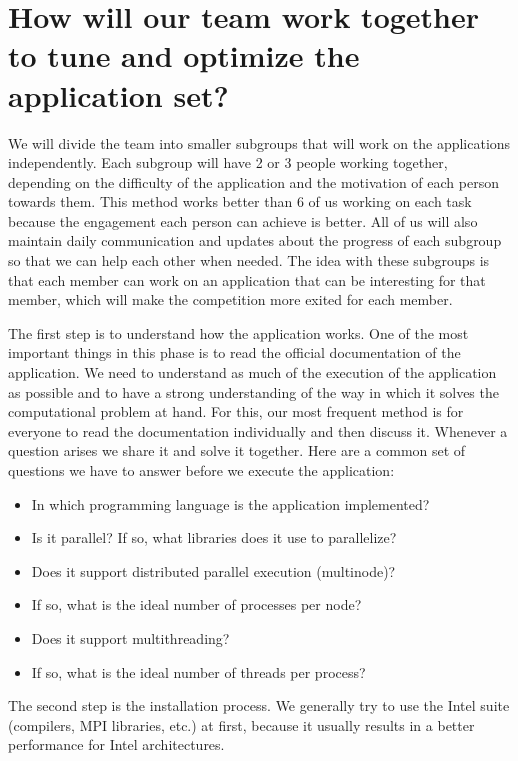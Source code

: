 \documentclass[11pt,a4paper,twocolumn]{article}
\begin{document}
    \section{How will our team work together to tune and optimize the application set?}

    We will divide the team into smaller subgroups that will work on the applications independently. Each subgroup will have 2 or 3 people working together, depending on the difficulty of the application and the motivation of each person towards them. This method works better than 6 of us working on each task because the engagement each person can achieve is better. All of us will also maintain daily communication and updates about the progress of each subgroup so that we can help each other when needed. The idea with these subgroups is that each member can work on an application that can be interesting for that member, which will make the competition more exited for each member.

    The first step is to understand how the application works. One of the most important things in this phase is to read the official documentation of the application. We need to understand as much of the execution of the application as possible and to have a strong understanding of the way in which it solves the computational problem at hand. For this, our most frequent method is for everyone to read the documentation individually and then discuss it. Whenever a question arises we share it and solve it together. Here are a common set of questions we have to answer before we execute the application:
    \begin{itemize}
        \item In which programming language is the application implemented?
        \item Is it parallel? If so, what libraries does it use to parallelize?
        \item Does it support distributed parallel execution (multinode)?
        \item If so, what is the ideal number of processes per node?
        \item Does it support multithreading?
        \item If so, what is the ideal number of threads per process?
    \end{itemize}

    The second step is the installation process. We generally try to use the Intel suite (compilers, MPI libraries, etc.) at first, because it usually results in a better performance for Intel architectures.
\end{document}
